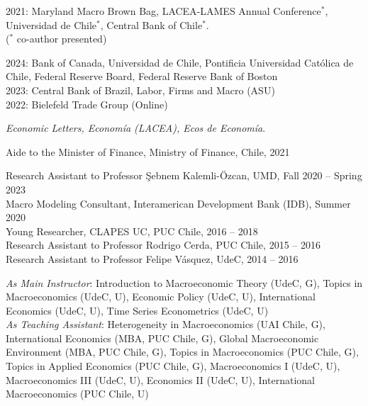\documentclass[10pt]{article}
\begin{document}
\begin{description}[leftmargin=10em,style=nextline]
      2021: Maryland Macro Brown Bag, LACEA-LAMES Annual Conference$^\ast$, Universidad de Chile$^\ast$, Central Bank of Chile$^\ast$.\\
      ({\footnotesize $^{*}$ co-author presented})\\[-.1in]
      \item[Invited Seminars] 2024: Bank of Canada, Universidad de Chile, Pontificia Universidad Cat\'olica de Chile, Federal Reserve Board, Federal Reserve Bank of Boston\\
      2023: Central Bank of Brazil, Labor, Firms and Macro (ASU)\\
      2022: Bielefeld Trade Group (Online)\\[-.1in]
      \item[Referee]  \emph{Economic Letters, Econom\'ia (LACEA), Ecos de Econom\'ia}.\\[-.1in]
      \item[Relevant] Aide to the Minister of Finance, Ministry of Finance, Chile, 2021\\[-0.22in]
      \item[Experience]  Research Assistant to Professor \c{S}ebnem Kalemli-\"{O}zcan, UMD, Fall 2020 -- Spring 2023\\
      Macro Modeling Consultant,  Interamerican Development Bank (IDB), Summer 2020\\
      Young Researcher, CLAPES UC, PUC Chile, 2016 -- 2018\\
      Research Assistant to Professor Rodrigo Cerda, PUC Chile, 2015 -- 2016\\
      Research Assistant to Professor Felipe V\'asquez, UdeC, 2014 -- 2016\\[-.1in]
      \item[Teaching Experience] \textit{As Main Instructor}: Introduction to Macroeconomic Theory (UdeC, G), Topics in Macroeconomics (UdeC, U), Economic Policy (UdeC, U), International Economics (UdeC, U), Time Series Econometrics (UdeC, U)\\
      \textit{As Teaching Assistant}: Heterogeneity in Macroeconomics (UAI Chile, G), International Economics (MBA, PUC Chile, G), Global Macroeconomic Environment (MBA, PUC Chile, G), Topics in Macroeconomics (PUC Chile, G), Topics in Applied Economics (PUC Chile, G), Macroeconomics I (UdeC, U), Macroeconomics III (UdeC, U), Economics II (UdeC, U), International Macroeconomics (PUC Chile, U)\\[-.1in]


\end{description}
\end{document}
